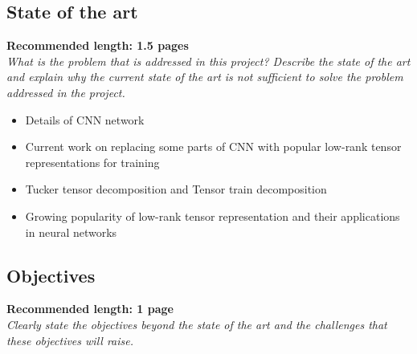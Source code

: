 
\subsection*{State of the art}
\textbf{Recommended length: 1.5 pages}\\

\textit{What is the problem that is addressed in this project? Describe the state of the art and explain why the current state of the art is not sufficient to solve the problem addressed in the project.} 


\begin{itemize}
	\item Details of CNN network
	\item Current work on replacing some parts of CNN with popular low-rank tensor representations for training
	\item Tucker tensor decomposition and Tensor train decomposition
	\item Growing popularity of low-rank tensor representation and their applications in neural networks
\end{itemize}
%	


\subsection*{Objectives}
\textbf{Recommended length: 1 page}\\

\textit{Clearly state the objectives beyond the state of the art and the challenges that these objectives will raise.}

